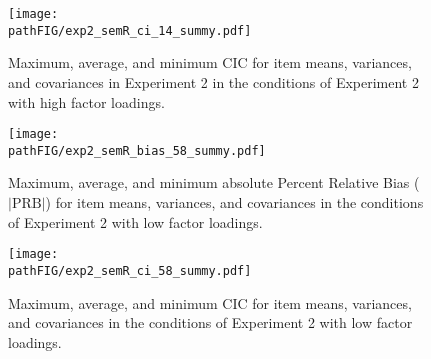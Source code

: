 \begin{figure}
	\texttt{[image: \\pathFIG/exp2\_semR\_ci\_14\_summy.pdf]}
\caption{
	Maximum, average, and minimum CIC for item means, variances, and covariances in Experiment 2
	in the conditions of Experiment 2 with high factor loadings.
}
\label{fig:exp2cir14}
\end{figure}

\begin{figure}
	\texttt{[image: \\pathFIG/exp2\_semR\_bias\_58\_summy.pdf]}
\caption{
	Maximum, average, and minimum absolute Percent Relative Bias ($|\text{PRB}|$) for item means, variances, 
	and covariances in the conditions of Experiment 2 with low factor loadings.
}
\label{fig:exp2bias58}
\end{figure}

\begin{figure}
	\texttt{[image: \\pathFIG/exp2\_semR\_ci\_58\_summy.pdf]}
\caption{
	Maximum, average, and minimum CIC for item means, variances, and covariances in the conditions of 
	Experiment 2 with low factor loadings.
}
\label{fig:exp2cir58}
\end{figure}

\FloatBarrier


